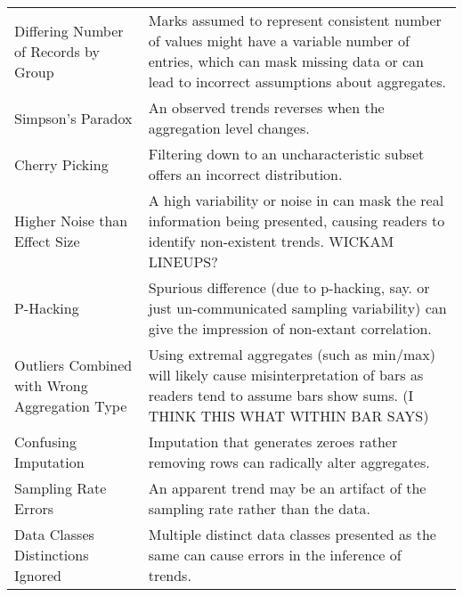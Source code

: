 \begin{table*}[]
\begin{tabular}{p{5cm}p{12cm}}
   \rowcolor{colorb}\multirow{9}{0em}{\hspace{-0.6cm}\rotatebox{90}{\normalsize{Wrangling}}}Differing Number of Records by Group & Marks assumed to represent consistent number of values might have a variable number of entries, which can mask missing data or can lead to incorrect assumptions about aggregates. \\
 \rowcolor{colorb-opaque}Simpson's Paradox & An observed trends reverses when the aggregation level changes. \cite{guo2017you}\\
 \rowcolor{colorb}Cherry Picking & Filtering down to an uncharacteristic subset offers an incorrect distribution. \cite{few2019loom}\\
 \rowcolor{colorb-opaque}Higher Noise than Effect Size & A high variability or noise in can mask the real information being presented, causing readers to identify non-existent trends. WICKAM LINEUPS?\\
 \rowcolor{colorb}P-Hacking & Spurious difference (due to p-hacking, say. or just un-communicated sampling variability) can give the impression of non-extant correlation. \cite{pu2018garden}\\
 \rowcolor{colorb-opaque}Outliers Combined with Wrong Aggregation Type & Using extremal aggregates (such as min/max) will likely cause misinterpretation of bars as readers tend to assume bars show sums. (I THINK THIS WHAT WITHIN BAR SAYS) \cite{newman2012bar}\\
 \rowcolor{colorb}Confusing Imputation & Imputation that generates zeroes rather removing rows can radically alter aggregates. \cite{song2018s}\\
 \rowcolor{colorb-opaque}Sampling Rate Errors  & An apparent trend may be an artifact of the sampling rate rather than the data. \cite{kindlmann2014algebraic}\\
 \rowcolor{colorb}Data Classes Distinctions Ignored & Multiple distinct data classes presented as the same can cause errors in the inference of trends. \cite{anand2015automatic}\\


\end{tabular}
\end{table*}
